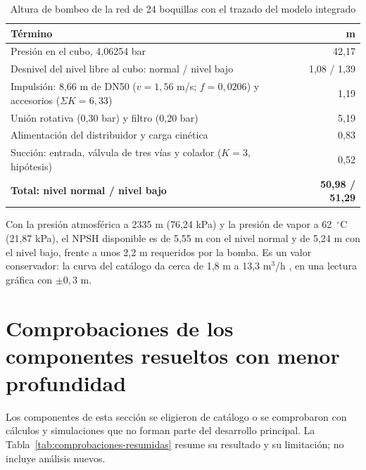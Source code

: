\begin{table}[htbp]
\centering\small\singlespacing
\caption{Altura de bombeo de la red de 24 boquillas con el trazado del modelo integrado}
\label{tab:red24-trazado}
\begin{tabularx}{\textwidth}{@{}Yr@{}}
\toprule
\textbf{Término} & \textbf{m}\\
\midrule
Presión en el cubo, 4,06254 bar & 42,17\\
Desnivel del nivel libre al cubo: normal / nivel bajo & 1,08 / 1,39\\
Impulsión: 8,66 m de DN50 ($v=1{,}56$ m/s; $f=0{,}0206$) y accesorios ($\Sigma K=6{,}33$) & 1,19\\
Unión rotativa (0,30 bar) y filtro (0,20 bar) & 5,19\\
Alimentación del distribuidor y carga cinética & 0,83\\
Succión: entrada, válvula de tres vías y colador ($K=3$, hipótesis) & 0,52\\
\midrule
\textbf{Total: nivel normal / nivel bajo} & \textbf{50,98 / 51,29}\\
\bottomrule
\end{tabularx}
\end{table}

Con la presión atmosférica a 2335 m (76,24 kPa) y la presión de vapor a 62~$^\circ$C (21,87 kPa), el NPSH disponible es de 5,55 m con el nivel normal y de 5,24 m con el nivel bajo, frente a unos 2,2 m requeridos por la bomba. Es un valor conservador: la curva del catálogo da cerca de 1,8 m a 13,3 m$^3$/h \cite[p.~50]{grundfoscr}, en una lectura gráfica con $\pm0{,}3$ m.

\section{Comprobaciones de los componentes resueltos con menor profundidad}
\label{sec:comprobaciones-resumidas}

Los componentes de esta sección se eligieron de catálogo o se comprobaron con cálculos y simulaciones que no forman parte del desarrollo principal. La Tabla~\ref{tab:comprobaciones-resumidas} resume su resultado y su limitación; no incluye análisis nuevos.

